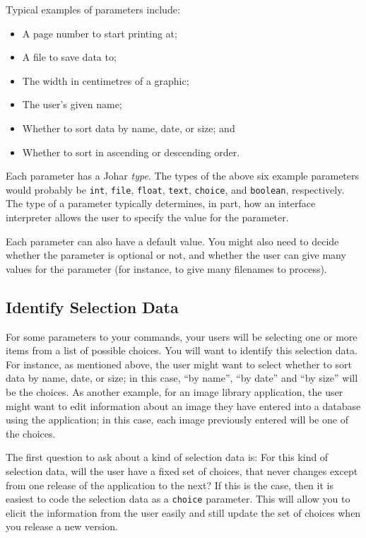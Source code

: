 \documentclass[11pt]{report}
\begin{document}
Typical examples of parameters include:
\begin{itemize}
\item A page number to start printing at;
\item A file to save data to;
\item The width in centimetres of a graphic;
\item The user's given name;
\item Whether to sort data by name, date, or size; and
\item Whether to sort in ascending or descending order.
\end{itemize}
Each parameter has a Johar {\it type}.  The types of the above
six example parameters would probably be
{\tt int},
{\tt file},
{\tt float},
{\tt text},
{\tt choice}, and
{\tt boolean},
respectively.
The type of a parameter typically determines, in part, how an
interface interpreter allows the user to specify the value for
the parameter.

Each parameter can also have a default value.  You might also
need to decide whether the parameter is optional or not, and
whether the user can give many values for the parameter (for
instance, to give many filenames to process).

\subsection{Identify Selection Data}

For some parameters to your commands, your users will be
selecting one or more items from a list of possible choices.
You will want to identify this selection data.  For instance, as
mentioned above, the user might want to select whether to sort
data by name, date, or size; in this case, ``by name'', ``by
date'' and ``by size'' will be the choices.  As another example,
for an image library application,
the user might want to edit information about an image
they have entered into a database using the application; in this
case, each image previously entered will be one of the choices.

The first question to ask about a kind of selection data is:
For this kind of selection data, will the
user have a fixed set of choices, that never changes except from
one release of the application to the next?  If this is the case,
then it is easiest to code the selection data as a {\tt choice}
parameter.  This will allow you to elicit the information from
the user easily and still update the set of choices when you
release a new version.
\end{document}
